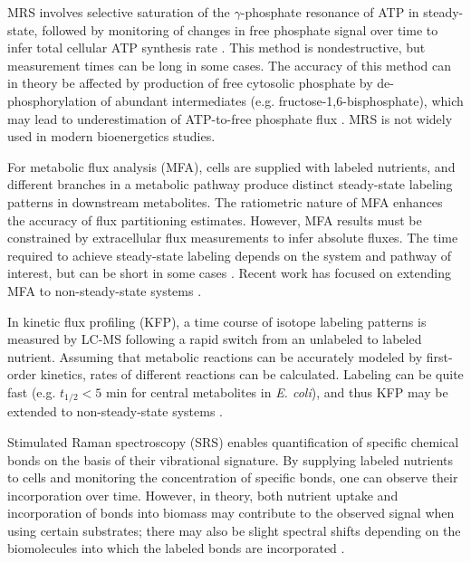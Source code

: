\documentclass{compactarticle}
\begin{document}
 MRS involves selective saturation of the $\gamma$-phosphate resonance of ATP in steady-state, followed by monitoring of changes in free phosphate signal over time to infer total cellular ATP synthesis rate \cite{brown197731p}. This method is nondestructive, but measurement times can be long in some cases. The accuracy of this method can in theory be affected by production of free cytosolic phosphate by de-phosphorylation of abundant intermediates (e.g. fructose-1,6-bisphosphate), which may lead to underestimation of ATP-to-free phosphate flux \cite{brindle1988phosphorous}.  MRS is not widely used in modern bioenergetics studies.

For metabolic flux analysis (MFA), cells are supplied with labeled nutrients, and different branches in a metabolic pathway produce distinct steady-state labeling patterns in downstream metabolites. The ratiometric nature of MFA enhances the accuracy of flux partitioning estimates. However, MFA results must be constrained by extracellular flux measurements to infer absolute fluxes. The time required to achieve steady-state labeling depends on the system and pathway of interest, but can be short in some cases \cite{zamboni201113c,antoniewicz2015methods}. Recent work has focused on extending MFA to non-steady-state systems \cite{leighty2011dynamic,cheah2018isotopically}.

In kinetic flux profiling (KFP), a time course of isotope labeling patterns is measured by LC-MS following a rapid switch from an unlabeled to labeled nutrient. Assuming that metabolic reactions can be accurately modeled by first-order kinetics, rates of different reactions can be calculated. Labeling can be quite fast (e.g. $t_{1/2} < 5$ min for central metabolites in \textit{E. coli}), and thus KFP may be extended to non-steady-state systems \cite{yuan2008kinetic}.

Stimulated Raman spectroscopy (SRS) enables quantification of specific chemical bonds on the basis of their vibrational signature. By supplying labeled nutrients to cells and monitoring the concentration of specific bonds, one can observe their incorporation over time. However, in theory, both nutrient uptake and incorporation of bonds into biomass may contribute to the observed signal when using certain substrates; there may also be slight spectral shifts depending on the biomolecules into which the labeled bonds are incorporated \cite{zhang2019spectral}.
\end{document}
